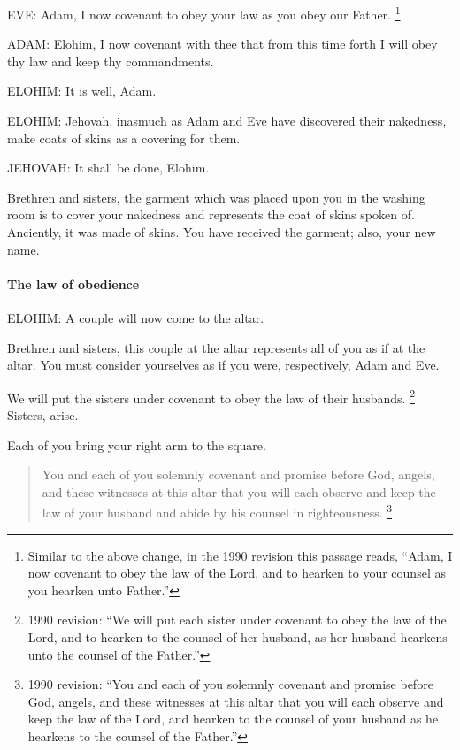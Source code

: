 				EVE: Adam, I now covenant to obey your law as you obey our Father.%
				\footnote{%
					\label{ENDOWMENT-obey-lord-2}%
					Similar to the above change, in the 1990 revision this passage reads, ``Adam, I now covenant to obey the law of the Lord, and to hearken to your counsel as you hearken unto Father.''
					} 

				ADAM: Elohim, I now covenant with thee that from this time forth I will obey thy law and keep thy commandments.

				ELOHIM: It is well, Adam.
				
				ELOHIM: Jehovah, inasmuch as Adam and Eve have discovered their nakedness, make coats of skins as a covering for them.

				JEHOVAH: It shall be done, Elohim.

				Brethren and sisters, the garment which was placed upon you in the washing room is to cover your nakedness and represents the coat of skins spoken of. Anciently, it was made of skins. You have received the garment; also, your new name.
			
			\paragraph{The law of obedience}
				\label{TEMPLE-ENDOWMENT-ENDOW-PRE-1990-OBEDIENCE}
			
				ELOHIM: A couple will now come to the altar.

				Brethren and sisters, this couple at the altar represents all of you as if at the altar. You must consider yourselves as if you were, respectively, Adam and Eve.

				We will put the sisters under covenant to obey the law of their husbands.%
					\footnote{%
						\label{ENDOWMENT-husbands}%
						1990 revision: ``We will put each sister under covenant to obey the law of the Lord, and to hearken to the counsel of her husband, as her husband hearkens unto the counsel of the Father.''
						}
				Sisters, arise.

				Each of you bring your right arm to the square.

				\begin{quote}
					You and each of you solemnly covenant and promise before God, angels, and these witnesses at this altar that you will each observe and keep the law of your husband and abide by his counsel in righteousness.%
						\footnote{%
							\label{ENDOWMENT-husband}%
							1990 revision: ``You and each of you solemnly covenant and promise before God, angels, and these witnesses at this altar that you will each observe and keep the law of the Lord, and hearken to the counsel of your husband as he hearkens to the counsel of the Father.''
							}
				\end{quote}

